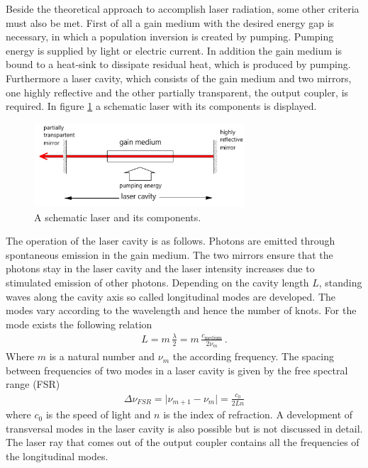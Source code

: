 Beside the theoretical approach to
accomplish laser radiation, some other criteria
must also be met.
First of all a gain medium with the desired
energy gap is necessary, in which
a population inversion is created by pumping.
Pumping energy is supplied by light or electric current.
In addition the gain medium is bound to a heat-sink
to dissipate residual heat, which is produced by pumping.
Furthermore a laser cavity,
which consists of the gain medium and two
mirrors, one highly reflective and the other
partially transparent,
the output coupler, is required.
In figure \ref{fig:laserschema}
a schematic laser with its components is displayed.
\begin{figure}
\centering
\includegraphics[width=0.7\textwidth]{laserkonzept.png}
\caption{A schematic laser and its components.
\cite{V61}}
\label{fig:laserschema}
\end{figure}
The operation of the laser cavity is as follows.
Photons are emitted through spontaneous emission
in the gain medium. The two mirrors
ensure that the photons stay in the laser cavity
and the laser intensity increases due to
stimulated emission of other photons.
Depending on the cavity length $L$,
standing waves along the cavity axis so called longitudinal modes
are developed.
The modes vary according to the wavelength and hence
the number of knots.
For the mode exists the following relation
\begin{align}
  L = m \, \frac{\lambda}{2} = m \, \frac{c_{\text{medium}}}{2 \nu_{m}} \, .
  \label{eqn:resonatorbedingung}
\end{align}
Where $m$ is a natural number and $\nu_{m}$ the according frequency.
The spacing
between frequencies of two modes in a laser
cavity is given by the free spectral range (FSR)
\begin{align}
\Delta \nu_{FSR} = \lvert \nu_{m + 1} - \nu_{m}\rvert = \frac{c_{0}}{2Ln}
\end{align}
where $c_{0}$ is the speed of light and $n$ is
the index of refraction.
A development of transversal modes in the laser cavity
is also possible but is not discussed in detail.
The laser ray that comes out of the output coupler
contains all the frequencies of the longitudinal modes.

